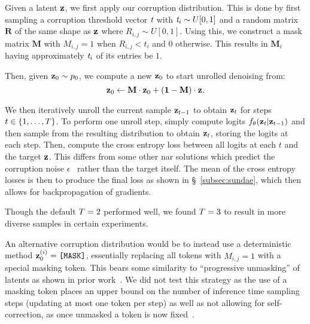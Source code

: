 Given a latent $\mathbf{z}$, we first apply our corruption distribution. This is
done by first sampling a corruption threshold vector $\textit{t}$ with
$\textit{t}_i \sim U[0, 1]$ and a random matrix $\mathbf{R}$ of the
same shape as $\mathbf{z}$ where $R_{i,j} \sim U[0,1]$. Using this, we construct a
mask matrix $\mathbf{M}$ with $M_{i,j} = 1$ when $R_{i,j} < t_i$ and $0$
otherwise. This results in $\mathbf{M}_i$ having approximately
$\textit{t}_i$ of its entries be $1$.

Then, given $\mathbf{z}_0 \sim p_0$, we compute a new $\mathbf{z}_0$ to start unrolled
denoising from:
\begin{equation}
    \mathbf{z}_0 \leftarrow \mathbf{M} \cdot \mathbf{z}_0 + (\mathbf{1} - \mathbf{M})
    \cdot \mathbf{z} \text{.}
\end{equation}

We then iteratively unroll the current sample $\mathbf{z}_{t-1}$ to obtain
$\mathbf{z}_t$ for steps $t\in \{1, \dots, T\}$. To perform one unroll
step, simply compute logits $f_\theta(\mathbf{z}_t \vert \mathbf{z}_{t-1})$ and then
sample from the resulting distribution to obtain $\mathbf{z}_t$, storing the logits
at each step. Then, compute the cross entropy loss between all logits at each
$t$ and the target $\mathbf{z}$. This differs from some other \gls{nar} solutions
which predict the corruption noise $\epsilon$~\cite{ho2020ddpm} rather than the
target itself. The mean of the cross entropy losses is then to produce the final
loss as shown in \S~\ref{subsec:sundae}, which then allows for backpropagation
of gradients.

Though the default $T = 2$ performed well, we found $T =
3$ to result in more diverse samples in certain experiments.

An alternative corruption distribution would be to instead use a deterministic
method $\mathbf{z}_0^{(i)}=\texttt{[MASK]}$, essentially replacing all tokens with
$M_{i,j} = 1$ with a special masking token. This bears some similarity to
``progressive unmasking'' of latents as shown in prior
work~\cite{bondtaylor2021unleashing,austin2021structured}. We did not test this
strategy as the use of a masking token places an upper bound on the number of
inference time sampling steps (updating at most one token per step) as well as
not allowing for self-correction, as once unmasked a token is now
fixed~\cite{bondtaylor2021unleashing,austin2021structured}. 


